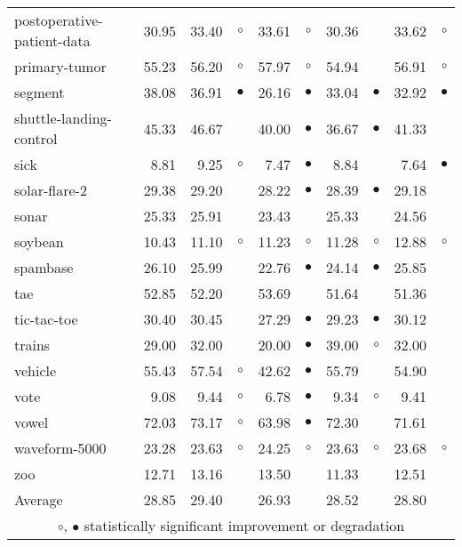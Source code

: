 {\begin{longtable}{lrr@{\hspace{0.1cm}}cr@{\hspace{0.1cm}}cr@{\hspace{0.1cm}}cr@{\hspace{0.1cm}}c}
postoperative-patient-data & 30.95 & 33.40 &   $\circ$ & 33.61 &    $\circ$ & 30.36 &            & 33.62 &    $\circ$\\
primary-tumor & 55.23 & 56.20 &   $\circ$ & 57.97 &    $\circ$ & 54.94 &            & 56.91 &    $\circ$\\
segment & 38.08 & 36.91 & $\bullet$ & 26.16 &  $\bullet$ & 33.04 &  $\bullet$ & 32.92 &  $\bullet$\\
shuttle-landing-control & 45.33 & 46.67 &           & 40.00 &  $\bullet$ & 36.67 &  $\bullet$ & 41.33 &           \\
sick &  8.81 &  9.25 &   $\circ$ &  7.47 &  $\bullet$ &  8.84 &            &  7.64 &  $\bullet$\\
solar-flare-2 & 29.38 & 29.20 &           & 28.22 &  $\bullet$ & 28.39 &  $\bullet$ & 29.18 &           \\
sonar & 25.33 & 25.91 &           & 23.43 &            & 25.33 &            & 24.56 &           \\
soybean & 10.43 & 11.10 &   $\circ$ & 11.23 &    $\circ$ & 11.28 &    $\circ$ & 12.88 &    $\circ$\\
spambase & 26.10 & 25.99 &           & 22.76 &  $\bullet$ & 24.14 &  $\bullet$ & 25.85 &           \\
tae & 52.85 & 52.20 &           & 53.69 &            & 51.64 &            & 51.36 &           \\
tic-tac-toe & 30.40 & 30.45 &           & 27.29 &  $\bullet$ & 29.23 &  $\bullet$ & 30.12 &           \\
trains & 29.00 & 32.00 &           & 20.00 &  $\bullet$ & 39.00 &    $\circ$ & 32.00 &           \\
vehicle & 55.43 & 57.54 &   $\circ$ & 42.62 &  $\bullet$ & 55.79 &            & 54.90 &           \\
vote &  9.08 &  9.44 &   $\circ$ &  6.78 &  $\bullet$ &  9.34 &    $\circ$ &  9.41 &           \\
vowel & 72.03 & 73.17 &   $\circ$ & 63.98 &  $\bullet$ & 72.30 &            & 71.61 &           \\
waveform-5000 & 23.28 & 23.63 &   $\circ$ & 24.25 &    $\circ$ & 23.63 &    $\circ$ & 23.68 &    $\circ$\\
zoo & 12.71 & 13.16 &           & 13.50 &            & 11.33 &            & 12.51 &           \\
\hline
Average & 28.85 & 29.40 &           & 26.93 &            & 28.52 &            & 28.80 &           \\
\hline
\multicolumn{10}{c}{$\circ$, $\bullet$ statistically significant improvement or degradation}\\
\end{longtable} \footnotesize \par}
